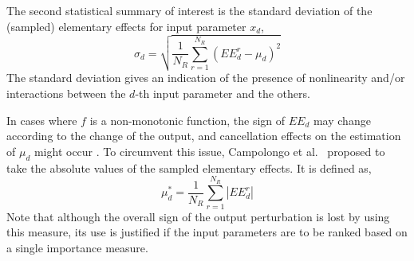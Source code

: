 The second statistical summary of interest is the standard deviation of the (sampled) elementary effects for input parameter $x_d$,
\begin{equation}
	\sigma_d = \sqrt{\frac{1}{N_R} \sum_{r = 1}^{N_R} (EE^r_d - \mu_d)^2}
	\label{eq:sa_morris_sd}
\end{equation} 
The standard deviation gives an indication of the presence of nonlinearity and/or interactions between the $d$-th input parameter and the others.

In cases where $f$ is a non-monotonic function,
the sign of $EE_d$ may change according to the change of the output,
and cancellation effects on the estimation of $\mu_d$ might occur .
To circumvent this issue,
Campolongo et al.~\cite{Campolongo2011} proposed to take the absolute values of the sampled elementary effects.
It is defined as,
\begin{equation}
	\mu^*_d = \frac{1}{N_R} \sum_{r = 1}^{N_R} |EE^r_d|
	\label{eq:sa_morris_mustar}
\end{equation}
Note that although the overall sign of the output perturbation is lost by using this measure,
its use is justified if the input parameters are to be ranked based on a single importance measure.

